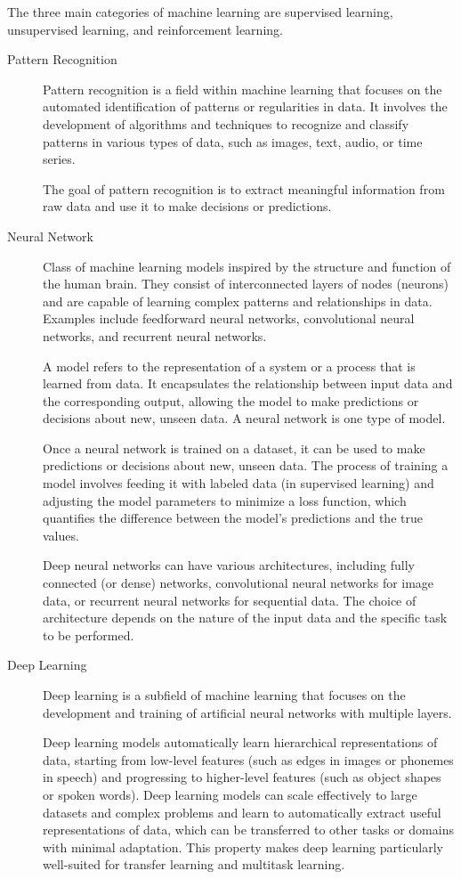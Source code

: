 \documentclass[a4paper]{report}
\begin{document}
The three main categories of machine learning are supervised learning, unsupervised learning, and reinforcement learning.

\begin{description}
\item[Pattern Recognition]
Pattern recognition is a field within machine learning that focuses on the automated identification of patterns or regularities in data. It involves the development of algorithms and techniques to recognize and classify patterns in various types of data, such as images, text, audio, or time series.

The goal of pattern recognition is to extract meaningful information from raw data and use it to make decisions or predictions.

\item[Neural Network]
Class of machine learning models inspired by the structure and function of the human brain. They consist of interconnected layers of nodes (neurons) and are capable of learning complex patterns and relationships in data. Examples include feedforward neural networks, convolutional neural networks, and recurrent neural networks.

A model refers to the representation of a system or a process that is learned from data. It encapsulates the relationship between input data and the corresponding output, allowing the model to make predictions or decisions about new, unseen data. A neural network is one type of model.

Once a neural network is trained on a dataset, it can be used to make predictions or decisions about new, unseen data. The process of training a model involves feeding it with labeled data (in supervised learning) and adjusting the model parameters to minimize a loss function, which quantifies the difference between the model's predictions and the true values. 

Deep neural networks can have various architectures, including fully connected (or dense) networks, convolutional neural networks for image data, or recurrent neural networks for sequential data. The choice of architecture depends on the nature of the input data and the specific task to be performed.

\item[Deep Learning] 
Deep learning is a subfield of machine learning that focuses on the development and training of artificial neural networks with multiple layers. 

Deep learning models automatically learn hierarchical representations of data, starting from low-level features (such as edges in images or phonemes in speech) and progressing to higher-level features (such as object shapes or spoken words). Deep learning models can scale effectively to large datasets and complex problems and learn to automatically extract useful representations of data, which can be transferred to other tasks or domains with minimal adaptation. This property makes deep learning particularly well-suited for transfer learning and multitask learning.


\end{description}
\end{document}
